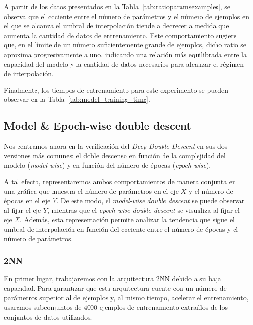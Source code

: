 A partir de los datos presentados en la Tabla~\ref{tab:ratioparamsexamples}, se observa que el cociente entre el número de parámetros y el número de ejemplos en el que se alcanza el umbral de interpolación tiende a decrecer a medida que aumenta la cantidad de datos de entrenamiento. Este comportamiento sugiere que, en el límite de un número suficientemente grande de ejemplos, dicho ratio se aproxima progresivamente a uno, indicando una relación más equilibrada entre la capacidad del modelo y la cantidad de datos necesarios para alcanzar el régimen de interpolación.\newline

Finalmente, los tiempos de entrenamiento para este experimento se pueden observar en la Tabla~\ref{tab:model_training_time}.\newline

\subsection{Model \& Epoch-wise double descent}\label{subsec:model-epoch-wise}

Nos centramos ahora en la verificación del \textit{Deep Double Descent} en sus dos versiones más comunes: el doble descenso en función de la complejidad del modelo (\textit{model-wise}) y en función del número de épocas (\textit{epoch-wise}).\newline

A tal efecto, representaremos ambos comportamientos de manera conjunta en una gráfica que muestra el número de parámetros en el eje $X$ y el número de épocas en el eje $Y$. De este modo, el \textit{model-wise double descent} se puede observar al fijar el eje $Y$, mientras que el \textit{epoch-wise double descent} se visualiza al fijar el eje $X$. Además, esta representación permite analizar la tendencia que sigue el umbral de interpolación en función del cociente entre el número de épocas y el número de parámetros.\newline

\subsubsection{2NN}\label{subsubsec:model-epoch-wise-2NN}

En primer lugar, trabajaremos con la arquitectura $2$NN debido a su baja capacidad. Para garantizar que esta arquitectura cuente con un número de parámetros superior al de ejemplos y, al mismo tiempo, acelerar el entrenamiento, usaremos subconjuntos de $4000$ ejemplos de entrenamiento extraídos de los conjuntos de datos utilizados.\newline

